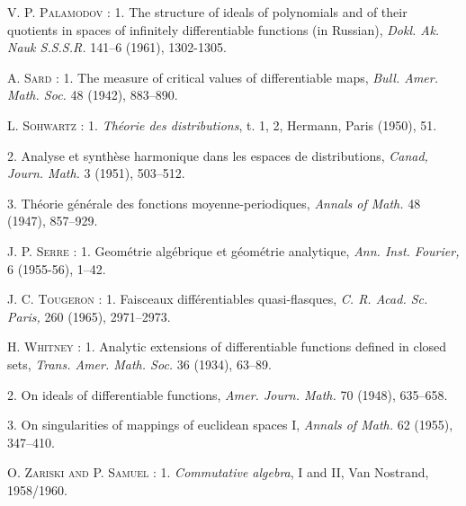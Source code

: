 \begin{thebibliography}{99}
 \textsc{V. P. Palamodov} : 1. The structure of ideals of polynomials and of their quotients in spaces of infinitely differentiable functions (in Russian), {\em Dokl. Ak. Nauk S.S.S.R.} 141--6 (1961), 1302-1305.

 \textsc{A. Sard} : 1. The measure of critical values of differentiable maps, {\em Bull. Amer. Math. Soc.} 48 (1942), 883--890.

 \textsc{L. Sohwartz} : 1. {\em Th\'eorie des distributions}, t. 1, 2, Hermann, Paris (1950), 51.

 2. Analyse et synth\`ese harmonique dans les espaces de distributions, {\em Canad, Journ. Math.} 3 (1951), 503--512.

 3. Th\'eorie g\'en\'erale des fonctions moyenne-periodiques, {\em Annals of Math.} 48 (1947), 857--929.

 \textsc{J. P. Serre} : 1. G\;eom\'etrie alg\'ebrique et g\'eom\'etrie analytique, {\em Ann. Inst. Fourier,} 6 (1955-56), 1--42.

 \textsc{J. C. Tougeron} : 1. Faisceaux diff\'erentiables quasi-flasques, {\em C. R. Acad. Sc. Paris,} 260 (1965), 2971--2973.

 \textsc{H. Whitney} : 1. Analytic extensions of differentiable functions defined in closed sets, {\em Trans. Amer. Math. Soc.} 36 (1934), 63--89. 

 2. On ideals of differentiable functions, {\em Amer. Journ. Math.} 70 (1948), 635--658.

 3. On singularities of mappings of euclidean spaces I, {\em Annals of Math.} 62 (1955), 347--410.

 \textsc{O. Zariski and P. Samuel} : 1. {\em Commutative algebra}, I and II, Van Nostrand, 1958/1960.
\end{thebibliography}

\newpage

~\phantom{a}
\thispagestyle{empty}

\vfill

